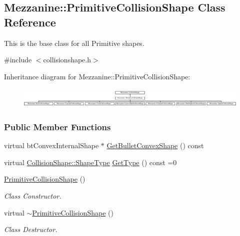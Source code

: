 \hypertarget{classMezzanine_1_1PrimitiveCollisionShape}{
\subsection{Mezzanine::PrimitiveCollisionShape Class Reference}
\label{classMezzanine_1_1PrimitiveCollisionShape}
}


This is the base class for all Primitive shapes.  




{\ttfamily \#include $<$collisionshape.h$>$}

Inheritance diagram for Mezzanine::PrimitiveCollisionShape:\begin{figure}[H]
\begin{center}
\leavevmode
\includegraphics[height=1.004184cm]{classMezzanine_1_1PrimitiveCollisionShape}
\end{center}
\end{figure}
\subsubsection*{Public Member Functions}
\begin{DoxyCompactItemize}
\item 
virtual btConvexInternalShape $\ast$ \hyperlink{classMezzanine_1_1PrimitiveCollisionShape_ac7eecc4d144b72fdfbea8a013fca441c}{GetBulletConvexShape} () const 
\item 
virtual \hyperlink{classMezzanine_1_1CollisionShape_ad04186055565998879b64176d6dd100d}{CollisionShape::ShapeType} \hyperlink{classMezzanine_1_1PrimitiveCollisionShape_ad3d4143a5640204b987e0b57eb24af41}{GetType} () const =0
\item 
\hypertarget{classMezzanine_1_1PrimitiveCollisionShape_a8b2158d50aa727df63b0855cc7b92506}{
\hyperlink{classMezzanine_1_1PrimitiveCollisionShape_a8b2158d50aa727df63b0855cc7b92506}{PrimitiveCollisionShape} ()}
\label{classMezzanine_1_1PrimitiveCollisionShape_a8b2158d50aa727df63b0855cc7b92506}

\begin{DoxyCompactList}\small\item\em Class Constructor. \item\end{DoxyCompactList}\item 
\hypertarget{classMezzanine_1_1PrimitiveCollisionShape_af2bbe57380bf282703f997286a5efde3}{
virtual \hyperlink{classMezzanine_1_1PrimitiveCollisionShape_af2bbe57380bf282703f997286a5efde3}{$\sim$PrimitiveCollisionShape} ()}
\label{classMezzanine_1_1PrimitiveCollisionShape_af2bbe57380bf282703f997286a5efde3}

\begin{DoxyCompactList}\small\item\em Class Destructor. \item\end{DoxyCompactList}\end{DoxyCompactItemize}
